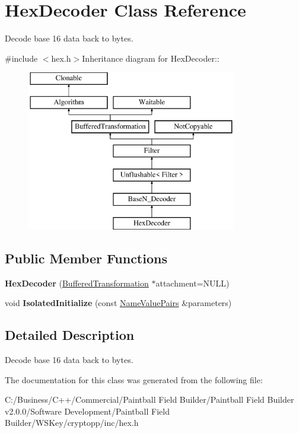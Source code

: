 \hypertarget{class_hex_decoder}{
\section{HexDecoder Class Reference}
\label{class_hex_decoder}
}


Decode base 16 data back to bytes.  


{\ttfamily \#include $<$hex.h$>$}Inheritance diagram for HexDecoder::\begin{figure}[H]
\begin{center}
\leavevmode
\includegraphics[height=7cm]{class_hex_decoder}
\end{center}
\end{figure}
\subsection*{Public Member Functions}
\begin{DoxyCompactItemize}
\item 
\hypertarget{class_hex_decoder_a942e58369981d49f57ee55fdcd2b8711}{
{\bfseries HexDecoder} (\hyperlink{class_buffered_transformation}{BufferedTransformation} $\ast$attachment=NULL)}
\label{class_hex_decoder_a942e58369981d49f57ee55fdcd2b8711}

\item 
\hypertarget{class_hex_decoder_a37fb07268b170d7a00c741e012278145}{
void {\bfseries IsolatedInitialize} (const \hyperlink{class_name_value_pairs}{NameValuePairs} \&parameters)}
\label{class_hex_decoder_a37fb07268b170d7a00c741e012278145}

\end{DoxyCompactItemize}


\subsection{Detailed Description}
Decode base 16 data back to bytes. 

The documentation for this class was generated from the following file:\begin{DoxyCompactItemize}
\item 
C:/Business/C++/Commercial/Paintball Field Builder/Paintball Field Builder v2.0.0/Software Development/Paintball Field Builder/WSKey/cryptopp/inc/hex.h\end{DoxyCompactItemize}
